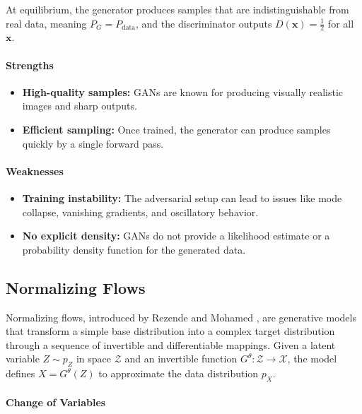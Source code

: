 At equilibrium, the generator produces samples that are indistinguishable from real data, meaning \( P_{G} = P_{\text{data}} \), and the discriminator outputs \( D(\mathbf{x}) = \frac{1}{2} \) for all \( \mathbf{x} \).

\paragraph{Strengths}
\begin{itemize}
    \item \textbf{High-quality samples:} GANs are known for producing visually realistic images and sharp outputs.
    \item \textbf{Efficient sampling:} Once trained, the generator can produce samples quickly by a single forward pass.
\end{itemize}

\paragraph{Weaknesses}
\begin{itemize}
    \item \textbf{Training instability:} The adversarial setup can lead to issues like mode collapse, vanishing gradients, and oscillatory behavior.
    \item \textbf{No explicit density:} GANs do not provide a likelihood estimate or a probability density function for the generated data.
\end{itemize}

\subsection{Normalizing Flows}\label{sec:normalizing_flows}

Normalizing flows, introduced by Rezende and Mohamed \cite{rezende2015variational}, are generative models that transform a simple base distribution into a complex target distribution through a sequence of invertible and differentiable mappings. Given a latent variable $Z \sim p_Z$ in space $\mathcal{Z}$ and an invertible function $G^\theta: \mathcal{Z} \rightarrow \mathcal{X}$, the model defines $X = G^\theta(Z)$ to approximate the data distribution $p_X$.

\paragraph{Change of Variables}

